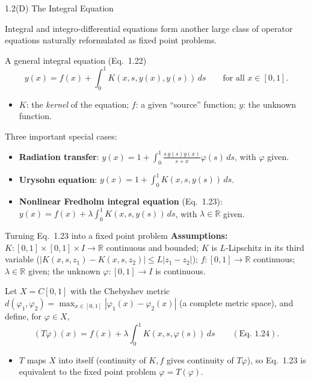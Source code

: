 \documentclass[aspectratio=169,10pt]{beamer}
\newcommand{\R}{\mathbb{R}}
\begin{document}
\begin{frame}[allowframebreaks]{1.2(D) The Integral Equation}

Integral and integro-differential equations form another large class of
operator equations naturally reformulated as fixed point problems.

\begin{block}{A general integral equation (Eq.\ 1.22)}
\[
  y(x) = f(x) + \int_0^1 K(x,s,y(x),y(s))\,ds \qquad \text{for all } x\in[0,1].
\]
\begin{itemize}
  \item $K$: the \emph{kernel} of the equation; $f$: a given ``source''
    function; $y$: the unknown function.
\end{itemize}
\end{block}

Three important special cases:
\begin{itemize}
  \item \textbf{Radiation transfer}: $y(x)=1+\int_0^1
    \frac{s\,y(s)y(x)}{s+x}\varphi(s)\,ds$, with $\varphi$ given.
  \item \textbf{Urysohn equation}: $y(x)=1+\int_0^1 K(x,s,y(s))\,ds$.
  \item \textbf{Nonlinear Fredholm integral equation} (Eq.\ 1.23):
    $y(x)=f(x)+\lambda\int_0^1 K(x,s,y(s))\,ds$, with $\lambda\in\R$
    given.
\end{itemize}

\framebreak

\begin{block}{Turning Eq.\ 1.23 into a fixed point problem}
\textbf{Assumptions:} $K:[0,1]\times[0,1]\times I\to\R$ continuous and
bounded; $K$ is $L$-Lipschitz in its third variable
($|K(x,s,z_1)-K(x,s,z_2)|\le L|z_1-z_2|$); $f:[0,1]\to\R$ continuous;
$\lambda\in\R$ given; the unknown $\varphi:[0,1]\to I$ is continuous.

Let $X=C[0,1]$ with the Chebyshev metric
$d(\varphi_1,\varphi_2)=\max_{x\in[0,1]}|\varphi_1(x)-\varphi_2(x)|$ (a
complete metric space), and define, for $\varphi\in X$,
\[
  (T\varphi)(x) = f(x) + \lambda\int_0^1 K(x,s,\varphi(s))\,ds \qquad (\text{Eq. } 1.24).
\]
\begin{itemize}
  \item $T$ maps $X$ into itself (continuity of $K,f$ gives continuity of
    $T\varphi$), so Eq.\ 1.23 is equivalent to the fixed point problem
    $\varphi=T(\varphi)$.
\end{itemize}
\end{block}


\end{frame}
\end{document}
